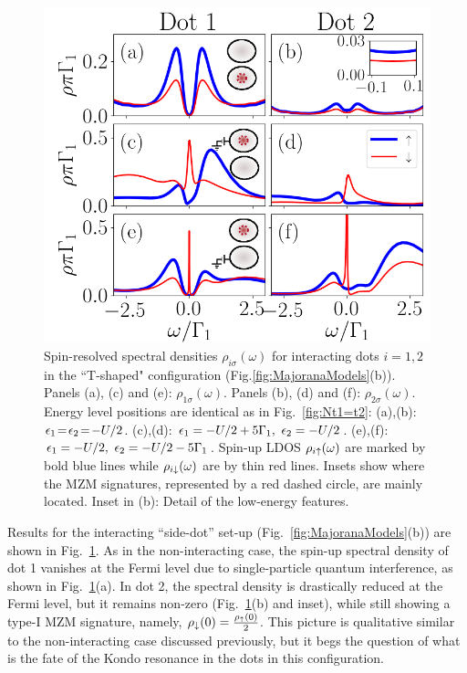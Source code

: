 \documentclass[showpacs,aps,prb,reprint,superscriptaddress]{revtex4-2}
\newcommand{\change}[1]{\textcolor{red}{\sl#1}}
\begin{document}
\begin{figure}[bt]
\begin{center}
\includegraphics[scale=0.45]{Graficos/b_Nt1gt0.png}
\caption{  \label{fig:Nt1>0} Spin-resolved spectral densities $\rho_{i \sigma}(\omega)$ for interacting  dots $i=1,2$ in the ``T-shaped" configuration (Fig.\ref{fig:MajoranaModels}(b)). Panels (a), (c) and (e): $\rho_{1 \sigma}(\omega)$. Panels (b), (d) and  (f): $\rho_{2 \sigma}(\omega)$. Energy level  positions are identical as in Fig.\ \ref{fig:Nt1=t2}: (a),(b): $\epsilon_1\!=\!\epsilon_2\!=\!-U/2$. (c),(d): $\epsilon_1=-U/2+5\Gamma_1, \ \epsilon_2 =-U/2$.  (e),(f): $\epsilon_1=-U/2, \ \epsilon_2 =-U/2-5\Gamma_1$.  Spin-up LDOS $\rho_{i \uparrow}(\omega)$ are marked by bold blue lines while $\rho_{i \downarrow}(\omega)$ are by thin red lines. Insets show where the MZM signatures, represented by a red dashed circle, are mainly located. Inset in (b): Detail of the low-energy features.
%
}
%
\end{center}
\end{figure}




 Results for the interacting ``side-dot'' set-up (Fig.\ \ref{fig:MajoranaModels}(b)) are shown in Fig.\ \ref{fig:Nt1>0}. As in the non-interacting case, the spin-up spectral density of dot 1  vanishes at the Fermi level due to single-particle quantum interference, as shown in Fig.\ \ref{fig:Nt1>0}(a). In dot 2, the spectral density is drastically reduced at the Fermi level, but it remains non-zero (Fig.\ \ref{fig:Nt1>0}(b) and inset), while still showing a type-I MZM signature, namely, \change{$\rho_\downarrow(0)=\frac{\rho_\uparrow(0)}{2}$}. This picture is qualitative similar to the non-interacting case discussed previously, but it begs the question of what is the fate of the Kondo resonance in the dots in this configuration.
\end{document}
